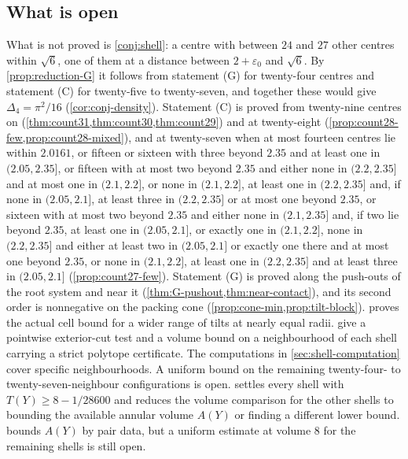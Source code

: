 \documentclass[11pt,reqno]{amsart}
\renewcommand{\_}{\origunderscore\allowbreak}
\numberwithin{equation}{section}
\theoremstyle{plain}
\theoremstyle{definition}
\theoremstyle{remark}
\begin{document}
\subsection{What is open}

What is not proved is \cref{conj:shell}: a centre with between $24$ and $27$
other centres within $\sqrt6$, one of them at a distance between
$2+\varepsilon_0$ and $\sqrt6$. By \cref{prop:reduction-G} it follows from
statement (G) for twenty-four centres and statement (C) for twenty-five to
twenty-seven, and together these would give $\Delta_4=\pi^2/16$
(\cref{cor:conj-density}). Statement (C) is proved from twenty-nine centres on
(\cref{thm:count31,thm:count30,thm:count29}) and at twenty-eight
(\cref{prop:count28-few,prop:count28-mixed}), and at twenty-seven when at most
fourteen centres lie within $2.0161$, or fifteen or sixteen with three
beyond $2.35$ and at least one in $(2.05,2.35]$, or fifteen with at most
two beyond $2.35$ and either none in $(2.2,2.35]$ and at most one in $(2.1,2.2]$, or none in $(2.1,2.2]$, at least one in $(2.2,2.35]$ and, if none in $(2.05,2.1]$, at least three in $(2.2,2.35]$ or at most one beyond $2.35$, or sixteen with at most two beyond $2.35$
and either none in $(2.1,2.35]$ and, if two lie beyond $2.35$, at least one in $(2.05,2.1]$, or exactly one in $(2.1,2.2]$, none in $(2.2,2.35]$ and either at least two in $(2.05,2.1]$ or exactly one there and at most one beyond $2.35$, or none in $(2.1,2.2]$, at least one in $(2.2,2.35]$ and at least three in $(2.05,2.1]$ (\cref{prop:count27-few}).
Statement (G) is proved along the
push-outs of the root system and near it
(\cref{thm:G-pushout,thm:near-contact}), and its second order is
nonnegative on the packing cone (\cref{prop:cone-min,prop:tilt-block}).
 proves the actual cell bound for a wider range
of tilts at nearly equal radii. 
give a pointwise exterior-cut test and a volume bound on a neighbourhood of
each shell carrying a strict polytope certificate. The computations in
\cref{sec:shell-computation} cover specific neighbourhoods. A uniform bound
on the remaining twenty-four- to twenty-seven-neighbour configurations is open.
 settles every shell with $T(Y)\ge8-1/28600$ and
reduces the volume comparison for the other shells to bounding the
available annular volume $A(Y)$ or finding a different lower bound.
 bounds $A(Y)$ by pair data, but a
uniform estimate at volume $8$ for the remaining shells is still open.
\end{document}
